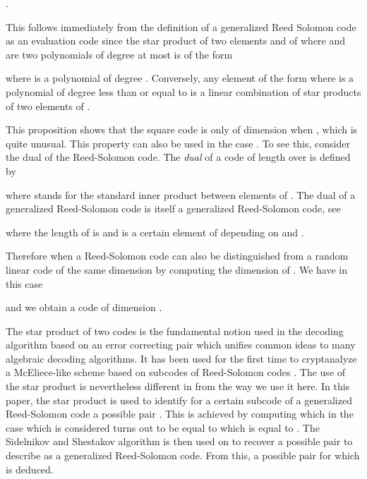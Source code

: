 \documentclass[runningheads,11pt]{llncs}
\begin{document}
\begin{proposition}\label{prop:square}
.
\end{proposition}

This follows immediately from the definition of a generalized Reed Solomon code as an evaluation code since
the star product of two elements  and  of  where
 and  are two polynomials of degree at most  is of the form 

where  is a polynomial of degree . Conversely, any element of the form 
where  is a polynomial of degree less than or equal to   is a linear combination of star products of two elements of .

This proposition shows
that the square code is only of dimension  when , which is quite unusual.
This property can also be used in the case . To see this, consider the dual of the Reed-Solomon code.
The {\em dual}  of a code  of length  over  is defined by 
 
where  stands for the standard inner product between elements of .
The dual of a generalized Reed-Solomon code is itself a generalized Reed-Solomon code, see
\cite[Theorem 4, p.304]{MacSloBook}


 \begin{proposition}\label{pr:dual}
 
 where the length of  is  and  is a certain element of  depending 
 on  and .
 \end{proposition}

 Therefore when  a Reed-Solomon code  can also be distinguished from 
 a random linear code of the same dimension by computing the dimension of
 . We have in this case
 
 and we obtain a code of dimension .

 The star product of two codes is the fundamental notion used in the decoding algorithm based on an error correcting pair
 \cite{Pel92,Kot92a} which unifies common ideas to many algebraic
 decoding algorithms. It has been used for the first time to 
cryptanalyze a McEliece-like scheme \cite{BL05} based on subcodes of Reed-Solomon codes
 \cite{Wie10}. The use of the star product is nevertheless different in \cite{Wie10} from the way we use it here. In this paper,
 the star product is used to identify  for a certain subcode   of a generalized Reed-Solomon code 
 a possible pair . This is achieved by computing  which in the case which is considered turns out to 
 be equal to  which is equal to . The Sidelnikov and Shestakov algorithm is then 
 used on   to recover a possible  pair to describe  as a generalized Reed-Solomon
 code. From this, a possible  pair for which  is deduced.
\end{document}
